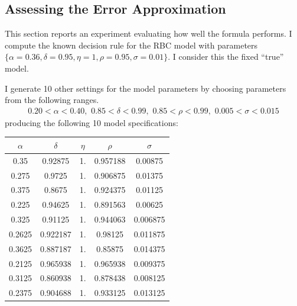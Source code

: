 \documentclass[12pt]{article}
\begin{document}
\subsection{Assessing the Error Approximation}
\label{sec:assess-error-appr}


This section reports an experiment evaluating how well the 
formula performs.  
I compute the known decision rule for the RBC model with parameters
$\{\alpha=0.36,\delta=0.95,\eta=1,\rho=0.95,\sigma=0.01\}$.  I consider this
the fixed ``true'' model.

I generate  10 other settings for the model parameters by choosing
parameters from the following ranges.
\begin{gather*}
 0.20 <\alpha<0.40,\,\,0.85<\delta<0.99,\,\,0.85<\rho<0.99,\,\,0.005<\sigma<0.015
\end{gather*}
producing the following 10 model specifications:


\vspace{.2in}



   \begin{tabular}{|c|c|c|c|c|}
\hline
\multicolumn{1}{|c|}{$\alpha$}&
\multicolumn{1}{|c|}{$\delta$}&
\multicolumn{1}{|c|}{$\eta$}&
\multicolumn{1}{|c|}{$\rho$}&
\multicolumn{1}{|c|}{$\sigma$}\\
\hline
                   0.35 & 0.92875 & 1. & 0.957188 & 0.00875 \\
\hline
                   0.275 & 0.9725 & 1. & 0.906875 & 0.01375 \\
\hline
                   0.375 & 0.8675 & 1. & 0.924375 & 0.01125 \\
\hline
                   0.225 & 0.94625 & 1. & 0.891563 & 0.00625 \\
\hline
                   0.325 & 0.91125 & 1. & 0.944063 & 0.006875 \\
\hline
                   0.2625 & 0.922187 & 1. & 0.98125 & 0.011875 \\
\hline
                   0.3625 & 0.887187 & 1. & 0.85875 & 0.014375 \\
\hline
                   0.2125 & 0.965938 & 1. & 0.965938 & 0.009375 \\
\hline
                   0.3125 & 0.860938 & 1. & 0.878438 & 0.008125 \\
\hline
                   0.2375 & 0.904688 & 1. & 0.933125 & 0.013125 \\
\hline
                  \end{tabular}
\end{document}
